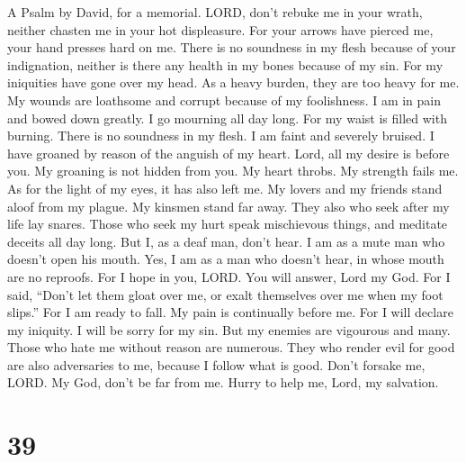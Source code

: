 A Psalm by David, for a memorial.  LORD, don't rebuke me
in your wrath, neither chasten me in your hot displeasure.
 For your arrows have pierced me, your hand presses hard
on me.  There is no soundness in my flesh because of your
indignation, neither is there any health in my bones because of my sin.
 For my iniquities have gone over my head. As a heavy
burden, they are too heavy for me.  My wounds are
loathsome and corrupt because of my foolishness.  I am in
pain and bowed down greatly. I go mourning all day long. 
For my waist is filled with burning. There is no soundness in my flesh.
 I am faint and severely bruised. I have groaned by reason
of the anguish of my heart.  Lord, all my desire is before
you. My groaning is not hidden from you.  My heart
throbs. My strength fails me. As for the light of my eyes, it has also
left me.  My lovers and my friends stand aloof from my
plague. My kinsmen stand far away.  They also who seek
after my life lay snares. Those who seek my hurt speak mischievous
things, and meditate deceits all day long.  But I, as a
deaf man, don't hear. I am as a mute man who doesn't open his mouth.
 Yes, I am as a man who doesn't hear, in whose mouth are
no reproofs.  For I hope in you, LORD. You will answer,
Lord my God.  For I said, ``Don't let them gloat over me,
or exalt themselves over me when my foot slips.''  For I
am ready to fall. My pain is continually before me.  For
I will declare my iniquity. I will be sorry for my sin. 
But my enemies are vigourous and many. Those who hate me without reason
are numerous.  They who render evil for good are also
adversaries to me, because I follow what is good.  Don't
forsake me, LORD. My God, don't be far from me.  Hurry to
help me, Lord, my salvation.

\hypertarget{section-38}{%
\section{39}\label{section-38}}

